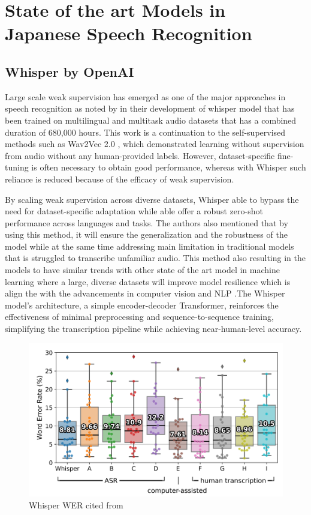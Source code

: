 \section{State of the art Models in Japanese Speech Recognition}
\subsection{Whisper by OpenAI}
Large scale weak supervision has emerged as one of the major approaches in speech recognition as noted by \textcite{radford2023robust} in their development of whisper model that has been trained on multilingual and multitask audio datasets that has a combined duration of 680,000 hours. This work is a continuation to the self-supervised methods such as Wav2Vec 2.0 \parencite{baevski2020wav2vec}, which demonstrated learning without supervision from audio without any human-provided labels. However, dataset-specific fine-tuning is often necessary to obtain good performance, whereas with Whisper such reliance is reduced because of the efficacy of weak supervision. 

By scaling weak supervision across diverse datasets, Whisper able to bypass the need for dataset-specific adaptation while able offer a robust zero-shot performance across languages and tasks. The authors also mentioned that by using this method, it will ensure the generalization and the robustness of the model while at the same time addressing main limitation in traditional models that is struggled to transcribe unfamiliar audio. This method also resulting in the models to have similar trends with other state of the art model in machine learning where a large, diverse datasets will improve model resilience which is align the with the advancements in computer vision \parencite{kolesnikov2020big} and NLP \parencite{radford2019language}.The Whisper model’s architecture, a simple encoder-decoder Transformer, reinforces the effectiveness of minimal preprocessing and sequence-to-sequence training, simplifying the transcription pipeline while achieving near-human-level accuracy.

\begin{figure}[!ht]
    \centering
    \includegraphics[width=.9\textwidth]{mainmatter//images/image.png}
    \caption{Whisper WER cited from \cite{radford2023robust}}
\end{figure}

